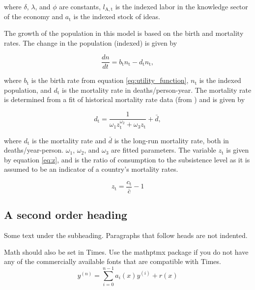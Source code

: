 \documentclass[letterpaper,12pt]{article}
\begin{document}
\noindent where $\delta$, $\lambda$, and $\phi$ are constants, $l_\mathrm{A,t}$ is the indexed labor in the knowledge sector of the economy and $a_\mathrm{t}$ is the indexed stock of ideas.

The growth of the population in this model is based on the birth and mortality rates. The change in the population (indexed) is given by

\begin{equation} \label{eq:dn_dt}
	\frac{dn}{dt} = b_\mathrm{t} n_\mathrm{t} - d_\mathrm{t} n_\mathrm{t},
\end{equation}

\noindent where $b_\mathrm{t}$ is the birth rate from equation \ref{eq:utility_function}, $n_\mathrm{t}$ is the indexed population, and $d_\mathrm{t}$ is the mortality rate in deaths/person-year. The mortality rate is determined from a fit of historical mortality rate data (from \citet{Jones2001}) and is given by

\begin{equation} \label{eq:mortality_rate}
	d_\mathrm{t} = \frac{1}{\omega_\mathrm{1} z_\mathrm{t}^{\omega_\mathrm{2}} + \omega_\mathrm{3} z_\mathrm{t}} + \bar d,
\end{equation}

\noindent where $d_\mathrm{t}$ is the mortality rate and $\bar d$ is the long-run mortality rate, both in deaths/year-person. $\omega_\mathrm{1}$, $\omega_\mathrm{2}$, and $\omega_\mathrm{3}$ are fitted parameters. The variable $z_\mathrm{t}$ is given by equation \ref{eq:z}, and is the ratio of consumption to the subsistence level as it is assumed to be an indicator of a country's mortality rates.

\begin{equation} \label{eq:z}
	z_\mathrm{t} = \frac{c_\mathrm{t}}{\bar c} - 1
\end{equation}



\subsection{A second order heading}

Some text under the subheading. Paragraphs that follow heads are not
indented.

Math should also be set in Times. Use the mathptmx package if you do not have
any of the commercially available fonts that are compatible with Times.
\begin{equation}
    y^{(n)} = \sum_{i=0}^{n-1} a_i(x) y^{(i)} + r(x) 
\end{equation}
\end{document}
